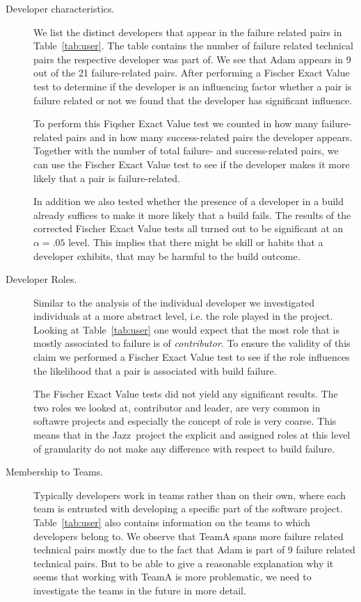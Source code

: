 \documentclass{sig-alternate}
\begin{document}
\begin{description}
\item[Developer characteristics.] 
We list the distinct developers that appear in the failure related pairs in
Table~\ref{tab:user}. The table contains the number of failure related technical pairs the respective developer was part of.  
We see that Adam appears in 9 out of the 21 failure-related pairs.
After performing a Fischer Exact Value test to determine if the developer is an influencing factor whether a pair is failure related or not we found that the developer has significant influence.

To perform this Fiqsher Exact Value test we counted in how many failure-related
pairs and in how many success-related pairs the developer appears. Together
with the number of total failure- and success-related pairs, we can use the
Fischer Exact Value test to see if the developer makes it more likely that a pair
is failure-related.

In addition we also tested whether the presence of a developer in a build
already suffices to make it more likely that a build fails. The results of the corrected Fischer Exact Value tests all turned out to be significant at an $\alpha=.05$ level.
This implies that there might be skill or habits that a developer exhibits, that may be harmful to the build outcome.

\item[Developer Roles.]
Similar to the analysis of the individual developer we investigated individuals
at a more abstract level, i.e. the role played in the project. Looking at
Table~\ref{tab:user} one would expect that the most role that is mostly
associated to failure is of \emph{contributor}. To ensure the validity of this
claim we performed a Fischer Exact Value test to see if the role influences the likelihood that a pair is associated with build failure.

The Fischer Exact Value tests did not yield any significant results. The two roles
we looked at, contributor and leader, are very common in softawre projects and
especially the concept of role is very coarse. This means that in the
Jazz\texttrademark\ project the explicit and assigned roles at this
 level of granularity do not make any difference with respect to build failure.
\item[Membership to Teams.] Typically developers work in teams rather than on
their own, where each team is entrusted with developing a specific part of the
software project. Table~\ref{tab:user} also contains information on the teams to
which developers belong to. We observe that TeamA spans more failure related
technical pairs mostly due to the fact that Adam is part of 9 failure related
technical pairs. But to be able to give a reasonable explanation why it seems
that working with TeamA is more problematic, we need to investigate the teams in
the future in more detail.


\end{description}
\end{document}
